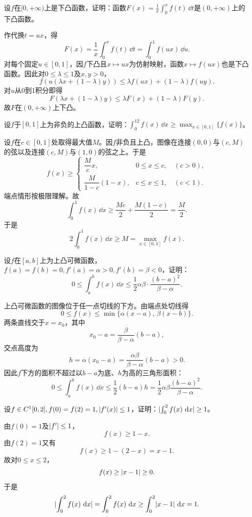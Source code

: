 \begin{xexercise}[2]
设$f$在$[0,+\infty)$上是下凸函数，证明：函数$F(x)=\frac1x\int_0^xf(t)\,\dd t$是$(0,+\infty)$上的下凸函数。
\end{xexercise}
\begin{xsolution}
作代换$t=ux$，得
\[
 F(x)=\frac1x\int_0^xf(t)\,\dd t=\int_0^1f(ux)\,\dd u.
\]
对每个固定$u\in[0,1]$，因$f$下凸且$x\mapsto ux$为仿射映射，函数$x\mapsto f(ux)$也是下凸函数。因此对$0\le\lambda\le1$及$x,y>0$，
\[
 f(u(\lambda x+(1-\lambda)y))
 \le\lambda f(ux)+(1-\lambda)f(uy).
\]
对$u$从0到1积分即得
\[
 F(\lambda x+(1-\lambda)y)
 \le\lambda F(x)+(1-\lambda)F(y).
\]
故$F$在$(0,+\infty)$上下凸。
\end{xsolution}


\begin{xexercise}[3]
设$f$于$[0,1]$上为非负的上凸函数，证明：$\int_0^12f(x)\,\dd x\ge\max_{x\in[0,1]}\{f(x)\}$。
\end{xexercise}
\begin{xsolution}
设$f$在$c\in[0,1]$处取得最大值$M$。因$f$非负且上凸，图像在连接$(0,0)$与$(c,M)$的弦以及连接$(c,M)$与$(1,0)$的弦之上。于是
\[
 f(x)\ge
 \begin{cases}
 \dfrac{M}{c}x,&0\le x\le c,\quad(c>0),\\[4pt]
 \dfrac{M}{1-c}(1-x),&c\le x\le1,\quad(c<1).
 \end{cases}
\]
端点情形按极限理解。故
\[
 \int_0^1f(x)\,\dd x
 \ge\frac{Mc}{2}+\frac{M(1-c)}2
 =\frac M2.
\]
于是
\[
 2\int_0^1f(x)\,\dd x\ge M=\max_{x\in[0,1]}f(x).
\]
\end{xsolution}


\begin{xexercise}[4]
设$f$在$[a,b]$上为上凸可微函数，$f(a)=f(b)=0,f'(a)=\alpha>0,f'(b)=\beta<0$，证明：
  \[
    0\le\int_a^bf(x)\,\dd x\le\frac12\alpha\beta\cdot\frac{(b-a)^2}{\beta-\alpha}.
  \]
\end{xexercise}
\begin{xsolution}
上凸可微函数的图像位于任一点切线的下方。由端点处切线得
\[
 0\le f(x)\le\min\{\alpha(x-a),\,\beta(x-b)\}.
\]
两条直线交于$x=x_0$，其中
\[
 x_0-a=\frac{\beta}{\beta-\alpha}(b-a),
\]
交点高度为
\[
 h=\alpha(x_0-a)=\frac{\alpha\beta}{\beta-\alpha}(b-a)>0.
\]
因此$f$下方的面积不超过以$b-a$为底、$h$为高的三角形面积：
\[
 0\le\int_a^bf(x)\,\dd x
 \le\frac12(b-a)h
 =\frac12\alpha\beta\frac{(b-a)^2}{\beta-\alpha}.
\]
\end{xsolution}


\begin{xexercise}[5]
设$f\in C^1[0,2],f(0)=f(2)=1,\lvert f'(x)\rvert\le1$，证明：$\lvert\int_0^2f(x)\,\mathop{}\!\mathrm{d} x\rvert\ge1$。
\end{xexercise}
\begin{xsolution}
由$f(0)=1$及$\lvert f'\rvert\le1$，
\[
 f(x)\ge1-x.
\]
由$f(2)=1$又有
\[
 f(x)\ge1-(2-x)=x-1.
\]
故对$0\le x\le2$，
\[
 f(x)\ge\lvert x-1\rvert\ge0.
\]
于是
\[
 \lvert\int_0^2f(x)\,\mathop{}\!\mathrm{d} x\rvert
 =\int_0^2f(x)\,\mathop{}\!\mathrm{d} x
 \ge\int_0^2\lvert x-1\rvert\,\mathop{}\!\mathrm{d} x=1.
\]
\end{xsolution}


